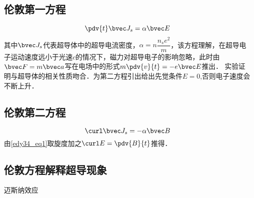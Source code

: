 \subsection{伦敦第一方程}
\begin{equation}
\pdv{t}\bvec J_s=\alpha\bvec E \label{edy34_eq1}
\end{equation}
其中$\bvec J_s$代表超导体中的超导电流密度，$\alpha=n\dfrac {n_se^2}m$，该方程理解，在超导电子运动速度远小于光速$c$的情况下，磁力对超导电子的影响忽略，此时由$\bvec F=m \bvec a$写在电场中的形式$m\pdv{v}{t}=-e\bvec E$推出．
实验证明与超导体的相关性质吻合．为第二方程引出给出先觉条件$E=0$,否则电子速度会不断上升．
\subsection{伦敦第二方程}
\begin{equation}
\curl\bvec J_s=-\alpha\bvec B \label{edy34_eq2}
\end{equation}
由\autoref{edy34_eq1}取旋度加之$\curl E=\pdv{B}{t}$推得．
\subsection{伦敦方程解释超导现象}
\begin{theorem}{迈斯纳效应}

\end{theorem}